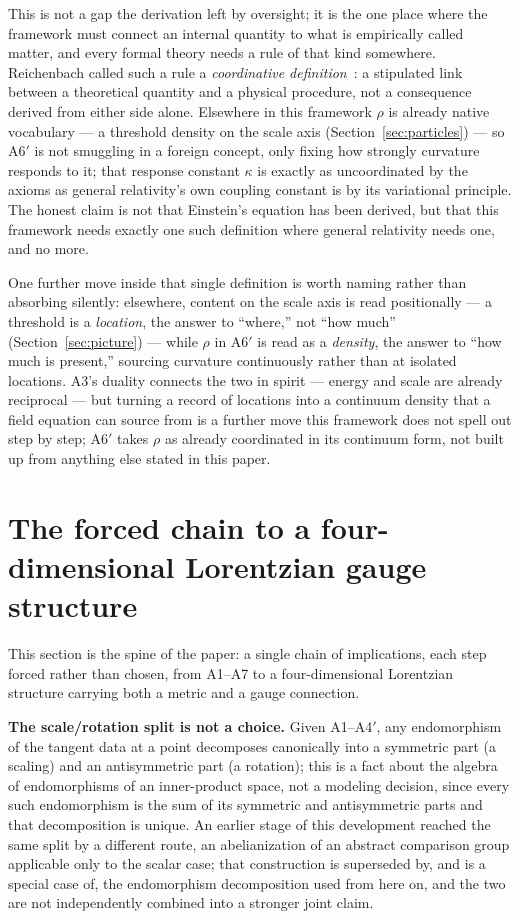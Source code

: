 \documentclass[pdflatex,sn-mathphys-num]{sn-jnl}
\theoremstyle{thmstyleone}
\theoremstyle{thmstylethree}
\theoremstyle{thmstyletwo}
\begin{document}
This is not a gap the derivation left by oversight; it is the one place
where the framework must connect an internal quantity to what is
empirically called matter, and every formal theory needs a rule of that
kind somewhere. Reichenbach called such a rule a \emph{coordinative
definition}~\cite{Reichenbach1958}: a stipulated link between a
theoretical quantity and a physical procedure, not a consequence derived
from either side alone. Elsewhere in this framework $\rho$ is already
native vocabulary — a threshold density on the scale axis
(Section~\ref{sec:particles}) — so A6$'$ is not smuggling in a foreign
concept, only fixing how strongly curvature responds to it; that
response constant $\kappa$ is exactly as uncoordinated by the axioms as
general relativity's own coupling constant is by its variational
principle. The honest claim is not that Einstein's equation has been
derived, but that this framework needs exactly one such definition where
general relativity needs one, and no more.

One further move inside that single definition is worth naming rather
than absorbing silently: elsewhere, content on the scale axis is read
positionally — a threshold is a \emph{location}, the answer to
``where,'' not ``how much'' (Section~\ref{sec:picture}) — while $\rho$ in
A6$'$ is read as a \emph{density}, the answer to ``how much is present,''
sourcing curvature continuously rather than at isolated locations. A3's
duality connects the two in spirit — energy and scale are already
reciprocal — but turning a record of locations into a continuum density
that a field equation can source from is a further move this framework
does not spell out step by step; A6$'$ takes $\rho$ as already
coordinated in its continuum form, not built up from anything else
stated in this paper.

\section{The forced chain to a four-dimensional Lorentzian gauge structure}\label{sec:chain}

This section is the spine of the paper: a single chain of implications,
each step forced rather than chosen, from A1–A7 to a four-dimensional
Lorentzian structure carrying both a metric and a gauge connection.

\textbf{The scale/rotation split is not a choice.} Given A1–A4$'$, any
endomorphism of the tangent data at a point decomposes canonically into a
symmetric part (a scaling) and an antisymmetric part (a rotation); this
is a fact about the algebra of endomorphisms of an inner-product space,
not a modeling decision, since every such endomorphism is the sum of its
symmetric and antisymmetric parts and that decomposition is unique. An
earlier stage of this development reached the same split by a different
route, an abelianization of an abstract comparison group applicable only
to the scalar case; that construction is superseded by, and is a special
case of, the endomorphism decomposition used from here on, and the two
are not independently combined into a stronger joint claim.
\end{document}
